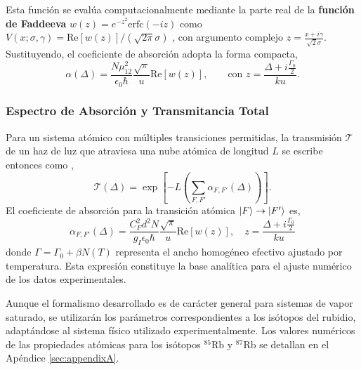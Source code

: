 Esta función se evalúa computacionalmente mediante la parte real de la \textbf{función de Faddeeva} $w(z) = e^{-z^2} \text{erfc}(-iz)$ como $V(x; \sigma, \gamma) = \text{Re}[w(z)] / (\sqrt{2\pi}\sigma)$ \cite{zentileElecSusProgramCalculate2015}, con argumento complejo $z = \frac{x + i\gamma}{\sqrt{2}\sigma}$. Sustituyendo, el coeficiente de absorción adopta la forma compacta,
\begin{equation}
    \alpha(\Delta) = \frac{N \mu_{12}^2}{\epsilon_0 \hbar} \frac{\sqrt{\pi}}{u} \text{Re}[w(z)], \qquad \text{con } z = \frac{\Delta + i \frac{\Gamma_0}{2}}{ku}.
\end{equation}
\subsubsection*{Espectro de Absorción y Transmitancia Total}
Para un sistema atómico con múltiples transiciones permitidas, la transmisión $\mathscr{T}$ de un haz de luz que atraviesa una nube atómica de longitud $L$ se escribe entonces como \cite{demtroderLaserSpectroscopy1996},
\begin{equation}
    \mathscr{T}(\Delta) = \exp \left[ - L \left( \sum_{F, F'} \alpha_{F, F'}(\Delta) \right) \right].
\end{equation}
El coeficiente de absorción para la transición atómica $\ket{F} \to \ket{F'}$ es,
\begin{equation}
    \boxed{
    \alpha_{F, F'}(\Delta) = \frac{C_F^2 d^2 N}{g_I\epsilon_0 \hbar} \frac{\sqrt{\pi}}{u} \text{Re}[w(z)] , \quad z = \frac{\Delta + i \frac{\Gamma_0}{2}}{ku}
    }
    \label{eq:absortion}
\end{equation}
donde $\Gamma= \Gamma_0 + \beta N(T)$ representa el ancho homogéneo efectivo ajustado por temperatura. Esta expresión constituye la base analítica para el ajuste numérico de los datos experimentales.

Aunque el formalismo desarrollado es de carácter general para sistemas de vapor saturado, se utilizarán los parámetros correspondientes a los isótopos del rubidio, adaptándose al sistema físico utilizado experimentalmente. Los valores numéricos de las propiedades atómicas para los isótopos $^{85}\text{Rb}$ y $^{87}\text{Rb}$ se detallan en el Apéndice \ref{sec:appendixA}.
